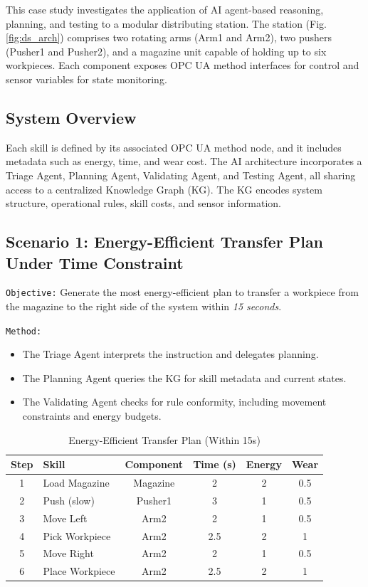 \begin{bibunit}
    This case study investigates the application of AI agent-based reasoning, planning, and testing to a modular distributing station. The station (Fig. \ref{fig:ds_arch}) comprises two rotating arms (Arm1 and Arm2), two pushers (Pusher1 and Pusher2), and a magazine unit capable of holding up to six workpieces. Each component exposes OPC UA method interfaces for control and sensor variables for state monitoring.
    
    \subsection{System Overview}
    Each skill is defined by its associated OPC UA method node, and it includes metadata such as energy, time, and wear cost. The AI architecture incorporates a Triage Agent, Planning Agent, Validating Agent, and Testing Agent, all sharing access to a centralized Knowledge Graph (KG). The KG encodes system structure, operational rules, skill costs, and sensor information.
    
    \subsection{Scenario 1: Energy-Efficient Transfer Plan Under Time Constraint}
    
    \texttt{Objective:} Generate the most energy-efficient plan to transfer a workpiece from the magazine to the right side of the system within \textit{15 seconds}.
    
    \texttt{Method:}
    \begin{itemize}
        \item The Triage Agent interprets the instruction and delegates planning.
        \item The Planning Agent queries the KG for skill metadata and current states.
        \item The Validating Agent checks for rule conformity, including movement constraints and energy budgets.
    \end{itemize}
    
    \begin{table}[h]
    \centering
    \caption{Energy-Efficient Transfer Plan (Within 15s)}
    \begin{tabular}{|c|l|c|c|c|c|}
    \hline
    \textbf{Step} & \textbf{Skill} & \textbf{Component} & \textbf{Time (s)} & \textbf{Energy} & \textbf{Wear} \\
    \hline
    1 & Load Magazine & Magazine & 2 & 2 & 0.5 \\
    2 & Push (slow) & Pusher1 & 3 & 1 & 0.5 \\
    3 & Move Left & Arm2 & 2 & 1 & 0.5 \\
    4 & Pick Workpiece & Arm2 & 2.5 & 2 & 1 \\
    5 & Move Right & Arm2 & 2 & 1 & 0.5 \\
    6 & Place Workpiece & Arm2 & 2.5 & 2 & 1 \\
    \hline
    \end{tabular}
    \label{tab:transfer_plan}
    \end{table}
    

\end{bibunit}
